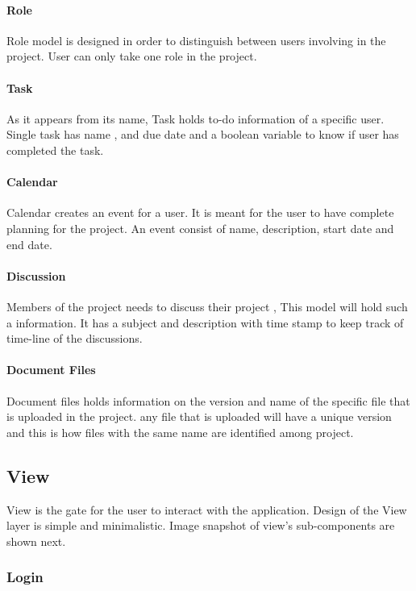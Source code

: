 \paragraph{Role}

Role model is designed in order to distinguish between users involving in the project. User can only take one role in the project. 

\paragraph{Task} %
As it appears from its name, Task holds to-do information of a specific user. Single task has name , and due date and a boolean variable to know if user has completed the task.

\paragraph{Calendar} %

Calendar creates an event for a user. It is meant for the user to have complete planning for the project. An event consist of name, description, start date and end date. 


\paragraph{Discussion} %
 Members of the project needs to discuss their project , This model will hold such a information. It has a subject and description with time stamp to keep track of time-line of the discussions. 


\paragraph{Document Files} %

Document files holds information on the version and name of the specific file that is uploaded in the project. any file that is uploaded will have a unique version and this is how files with the same name are identified among project.


\subsection{View} %
View is the gate for the user to interact with the application. Design of the View layer is simple and minimalistic. Image snapshot of view's sub-components are shown next.
\subsubsection{Login}

